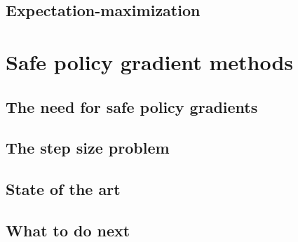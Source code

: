 \subsection{Expectation-maximization}

\section{Safe policy gradient methods}
\subsection{The need for safe policy gradients}
\subsection{The step size problem}
\subsection{State of the art}
\subsection{What to do next}